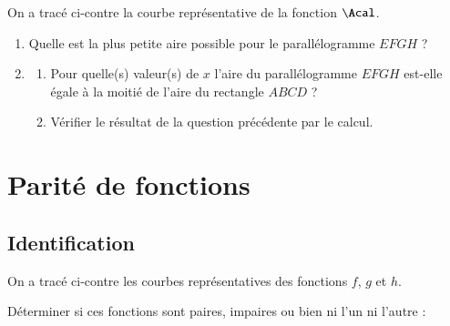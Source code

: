 \documentclass[oneside,12pt]{article}          			%
\begin{document}
\begin{minipage}{0.5\linewidth}
\end{minipage}
\begin{minipage}{0.5\linewidth}
On a tracé ci-contre la courbe représentative de la fonction $\Acal$.
	\begin{enumerate}
		\item[4.] Quelle est la plus petite aire possible pour le parallélogramme $EFGH$ ?
		\item[5.]
		\begin{enumerate}
			\item Pour quelle(s) valeur(s) de $x$ l'aire du parallélogramme $EFGH$ est-elle égale à la moitié de l'aire du rectangle $ABCD$ ?
			\item Vérifier le résultat de la question précédente par le calcul.
		\end{enumerate}
	\end{enumerate}
\end{minipage}



\section{Parité de fonctions}

\subsection{Identification}
On a tracé ci-contre les courbes représentatives des fonctions $f$, $g$ et $h$.

Déterminer si ces fonctions sont paires, impaires ou bien ni l'un ni l'autre :
\end{document}
